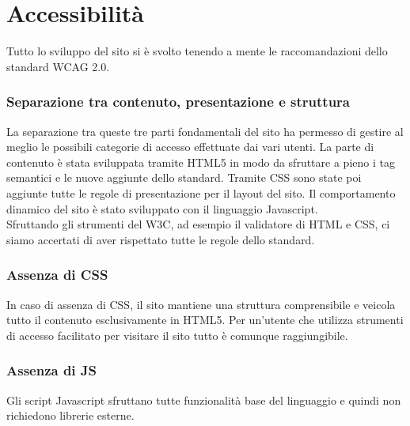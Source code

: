 \section{Accessibilità}
Tutto lo sviluppo del sito si è svolto tenendo a mente le raccomandazioni dello standard WCAG 2.0.

\subsubsection{Separazione tra contenuto, presentazione e struttura}
La separazione tra queste tre parti fondamentali del sito ha permesso di gestire al meglio le possibili categorie di accesso effettuate dai vari utenti. La parte di contenuto è stata sviluppata tramite HTML5 in modo da sfruttare a pieno i tag semantici e le nuove aggiunte dello standard. Tramite CSS sono state poi aggiunte tutte le regole di presentazione per il layout del sito. Il comportamento dinamico del sito è stato sviluppato con il linguaggio Javascript.\\ Sfruttando gli strumenti del W3C, ad esempio il validatore di HTML e CSS, ci siamo accertati di aver rispettato tutte le regole dello standard.

\subsubsection{Assenza di CSS}
In caso di assenza di CSS, il sito mantiene una struttura comprensibile e veicola tutto il contenuto esclusivamente in HTML5. Per un'utente che utilizza strumenti di accesso facilitato per visitare il sito tutto è comunque raggiungibile.

\subsubsection{Assenza di JS}
Gli script Javascript sfruttano tutte funzionalità base del linguaggio e quindi non richiedono librerie esterne.

